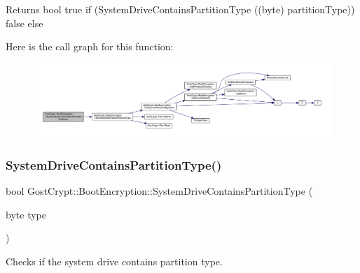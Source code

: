 \begin{DoxyReturn}{Returns}
bool true if (System\+Drive\+Contains\+Partition\+Type ((byte) partition\+Type)) false else 
\end{DoxyReturn}
Here is the call graph for this function\+:
\nopagebreak
\begin{figure}[H]
\begin{center}
\leavevmode
\includegraphics[width=350pt]{class_gost_crypt_1_1_boot_encryption_a097627633d56bf5421d836d036f6a0e7_cgraph}
\end{center}
\end{figure}
\mbox{\label{class_gost_crypt_1_1_boot_encryption_a3638d4139eef90bc7f913fea8290e49e}} 
\subsubsection{\texorpdfstring{System\+Drive\+Contains\+Partition\+Type()}{SystemDriveContainsPartitionType()}}
{\footnotesize\ttfamily bool Gost\+Crypt\+::\+Boot\+Encryption\+::\+System\+Drive\+Contains\+Partition\+Type (\begin{DoxyParamCaption}\item[{byte}]{type }\end{DoxyParamCaption})}



Checks if the system drive contains partition type. 


